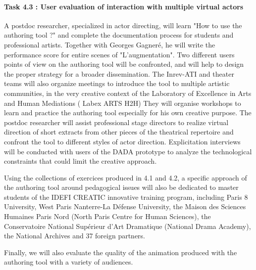 \paragraph{Task 4.3 : User evaluation of interaction with multiple virtual actors}

A postdoc researcher, specialized in actor directing, will learn "How to use the authoring tool ?" and complete the documentation process for students and professional artists. Together with Georges Gagner\'e, he will write the performance score for entire scenes of "L'augmentation". Two different users points of view on the authoring tool will be confronted, and will help to design the proper strategy for a broader dissemination. The Inrev-ATI and theater teams will also organize meetings to introduce the tool to multiple artistic communities, in the very creative context of the Laboratory of Excellence in Arts and Human Mediations ( Labex ARTS H2H) They will organise workshops to learn  and practice the authoring tool especially for his own creative purpose. The postdoc researcher will assist professional stage directors to realize virtual direction of short extracts from other pieces of the theatrical repertoire and confront the tool to different styles of actor direction. Explicitation interviews will be conducted with  users of the DADA prototype to analyze the technological constraints that could limit the creative approach. 

Using the collections of exercices produced in 4.1 and 4.2, a specific approach of the authoring tool  around pedagogical issues will also be dedicated to master students of the IDEFI CREATIC innovative training program, including Paris 8 University,  West Paris Nanterre-La D\'efense University, the Maison des Sciences Humaines Paris Nord (North Paris Centre for Human Sciences), the Conservatoire National Sup\'erieur d'Art Dramatique (National Drama Academy), the National Archives and 37 foreign partners. 

Finally, we will also evaluate the quality of the animation produced with the authoring tool with a variety of audiences.  


